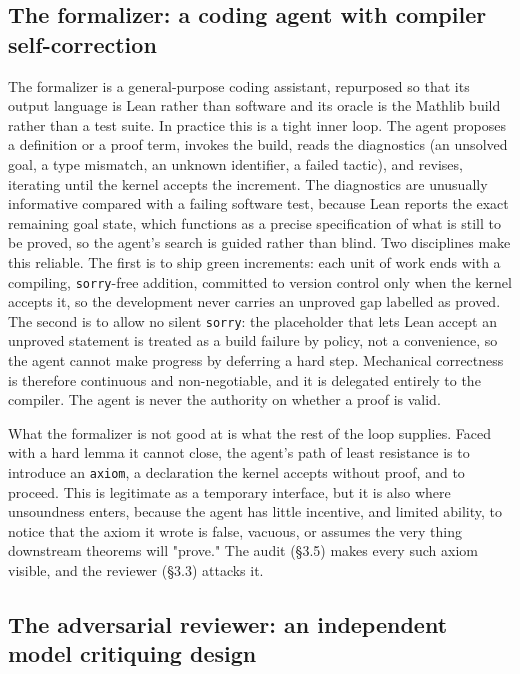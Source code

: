 \documentclass[11pt]{article}
\begin{document}
\subsection{The formalizer: a coding agent with compiler self-correction}

The formalizer is a general-purpose coding assistant, repurposed so that its output language is
Lean rather than software and its oracle is the Mathlib build rather than a test suite. In practice
this is a tight inner loop. The agent proposes a definition or a proof term, invokes the build,
reads the diagnostics (an unsolved goal, a type mismatch, an unknown identifier, a failed tactic),
and revises, iterating until the kernel accepts the increment. The diagnostics are unusually
informative compared with a failing software test, because Lean reports the exact remaining goal
state, which functions as a precise specification of what is still to be proved, so the agent's
search is guided rather than blind. Two disciplines make this reliable. The first is to ship green
increments: each unit of work ends with a compiling, \texttt{sorry}-free addition, committed to version
control only when the kernel accepts it, so the development never carries an unproved gap labelled
as proved. The second is to allow no silent \texttt{sorry}: the placeholder that lets Lean accept an
unproved statement is treated as a build failure by policy, not a convenience, so the agent cannot
make progress by deferring a hard step. Mechanical correctness is therefore continuous and
non-negotiable, and it is delegated entirely to the compiler. The agent is never the authority on
whether a proof is valid.

What the formalizer is not good at is what the rest of the loop supplies. Faced with a hard lemma
it cannot close, the agent's path of least resistance is to introduce an \texttt{axiom}, a declaration the
kernel accepts without proof, and to proceed. This is legitimate as a temporary interface, but it
is also where unsoundness enters, because the agent has little incentive, and limited ability, to
notice that the axiom it wrote is false, vacuous, or assumes the very thing downstream theorems
will "prove." The audit (§3.5) makes every such axiom visible, and the reviewer (§3.3) attacks it.

\subsection{The adversarial reviewer: an independent model critiquing design}
\end{document}
